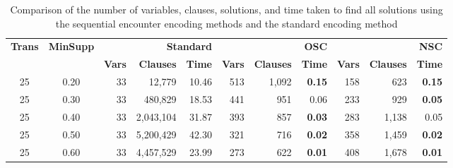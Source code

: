 \begin{table}[H]
    \centering
    \caption{Comparison of the number of variables, clauses, solutions, and time taken to find all solutions using the sequential encounter encoding methods and the standard encoding method}
    \label{tab:4_1}
    \begin{tabular}{|c|c|r|r|r|r|r|r|r|r|r|}
        \hline
        \multirow{2}{*}{\textbf{Trans}} & \multirow{2}{*}{\textbf{MinSupp}} & \multicolumn{3}{r|}{\textbf{Standard}} & \multicolumn{3}{r|}{\textbf{OSC}} & \multicolumn{3}{r|}{\textbf{NSC}}                                                                                                       \\ \cline{3-11}
                                        &                                   & \textbf{Vars}                          & \textbf{Clauses}                  & \textbf{Time}                     & \textbf{Vars} & \textbf{Clauses} & \textbf{Time} & \textbf{Vars} & \textbf{Clauses} & \textbf{Time} \\ \hline
        25                              & 0.20                              & 33                                     & 12,779                            & 10.46                             & 513           & 1,092            & \textbf{0.15} & 158           & 623              & \textbf{0.15} \\ \hline
        25                              & 0.30                              & 33                                     & 480,829                           & 18.53                             & 441           & 951              & 0.06          & 233           & 929              & \textbf{0.05} \\ \hline
        25                              & 0.40                              & 33                                     & 2,043,104                         & 31.87                             & 393           & 857              & \textbf{0.03} & 283           & 1,138            & 0.05          \\ \hline
        25                              & 0.50                              & 33                                     & 5,200,429                         & 42.30                             & 321           & 716              & \textbf{0.02} & 358           & 1,459            & \textbf{0.02} \\ \hline
        25                              & 0.60                              & 33                                     & 4,457,529                         & 23.99                             & 273           & 622              & \textbf{0.01} & 408           & 1,678            & \textbf{0.01} \\ \hline

\end{tabular}
\end{table}
